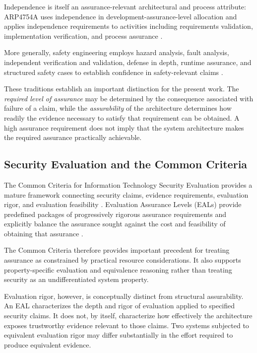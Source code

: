 Independence is itself an assurance-relevant architectural and process attribute:
ARP4754A uses independence in development-assurance-level allocation and applies
independence requirements to activities including
requirements validation, implementation verification, and process assurance \cite{saeARP4754A}.

More generally, safety engineering employs hazard analysis, fault analysis, independent verification and validation,
defense in depth, runtime assurance, and structured safety cases to establish confidence in safety-relevant claims
\cite{leveson2011engineering, rushby2007runtimeassurance}.

These traditions establish an important distinction for the present work.
The \emph{required level of assurance} may be determined by the consequence associated with failure of a claim, while the
\emph{assurability} of the architecture determines how readily the evidence necessary to satisfy that requirement can be obtained.
A high assurance requirement does not imply that the system architecture makes the required assurance practically achievable.

\subsection{Security Evaluation and the Common Criteria}

The Common Criteria for Information Technology Security Evaluation provides a mature framework connecting security claims, evidence requirements, evaluation rigor, and evaluation feasibility \cite{commonCriteria2022}. Evaluation Assurance Levels (EALs) provide predefined packages of progressively rigorous assurance requirements and explicitly balance the assurance sought against the cost and feasibility of obtaining that assurance \cite{commonCriteria2022part5}.

The Common Criteria therefore provides important precedent for treating assurance as constrained by practical resource considerations.
It also supports property-specific evaluation and equivalence reasoning rather than treating security as an undifferentiated system property.

Evaluation rigor, however, is conceptually distinct from structural assurability.
An EAL characterizes the depth and rigor of evaluation applied to specified security claims.
It does not, by itself, characterize how effectively the architecture exposes trustworthy evidence relevant to those claims. Two systems subjected to equivalent evaluation rigor may differ substantially in the effort required to produce equivalent evidence.

